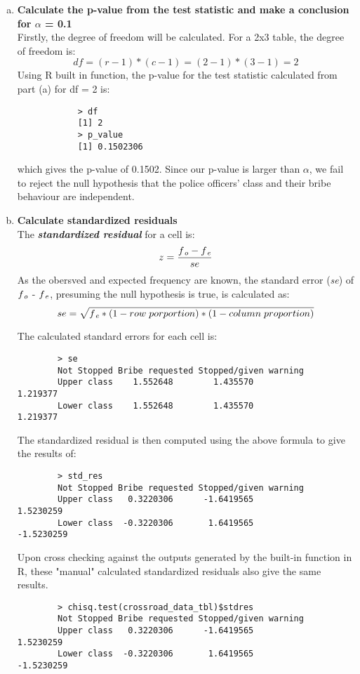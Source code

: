 \documentclass[12pt,letterpaper]{article}
\begin{document}
\begin{enumerate} [(a)]
	\item \textbf{Calculate the p-value from the test statistic and make a conclusion for $\alpha$ = 0.1} \\
	Firstly, the degree of freedom will be calculated. For a 2x3 table, the degree of freedom is:
		$$ df = (r - 1)*(c - 1) = (2 - 1)*(3 - 1) = 2$$
	Using R built in function, the p-value for the test statistic calculated from part (a) for df = 2 is:
		
		\begin{verbatim}
			> df
			[1] 2
			> p_value
			[1] 0.1502306
		\end{verbatim}
	which gives the p-value of 0.1502. Since our p-value is larger than $\alpha$, we fail to reject the null hypothesis that the police officers' class and their bribe behaviour are independent.
	
	\item \textbf{Calculate standardized residuals} \\
	The \textbf{\textit{standardized residual}} for a cell is:
		$$ z = \frac{f\textsubscript{\textit{o}} - f\textsubscript{\textit{e}}}{se}$$
	As the obersved and expected frequency are known, the standard error (\textit{se}) of $f\textsubscript{\textit{o}}$ - $f\textsubscript{\textit{e}}$, presuming the null hypothesis is true,  is calculated as:
		$$ se = \sqrt{f\textsubscript{\textit{e}}*(1 - row \; porportion)*(1 - column \; proportion)}$$
		
	The calculated standard errors for each cell is:
	\begin{verbatim}
		> se
		Not Stopped Bribe requested Stopped/given warning
		Upper class    1.552648        1.435570              1.219377
		Lower class    1.552648        1.435570              1.219377
	\end{verbatim}
	The standardized residual is then computed using the above formula to give the results of:
		
	\begin{verbatim}
		> std_res
		Not Stopped Bribe requested Stopped/given warning
		Upper class   0.3220306      -1.6419565             1.5230259
		Lower class  -0.3220306       1.6419565            -1.5230259
	\end{verbatim}
	Upon cross checking against the outputs generated by the built-in function in R, these "manual" calculated standardized residuals also give the same results.
		
	\begin{verbatim}
		> chisq.test(crossroad_data_tbl)$stdres
		Not Stopped Bribe requested Stopped/given warning
		Upper class   0.3220306      -1.6419565             1.5230259
		Lower class  -0.3220306       1.6419565            -1.5230259
	\end{verbatim}


\end{enumerate}
\end{document}

